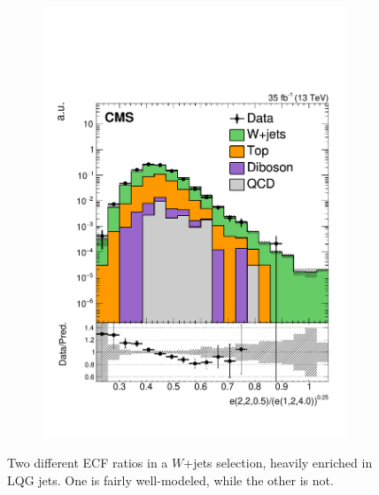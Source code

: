 \begin{figure}[]
\begin{center}
\begin{subfigure}[t]{0.32\textwidth}
            \includegraphics[width=\textwidth]{figures/toptagging/datamc/singlemuonw_ratio_22051240_logy.pdf}
        \end{subfigure}
        \caption{Two different ECF ratios in a $W$+jets selection, heavily enriched in LQG jets.
                 One is fairly well-modeled, while the other is not. }
        \label{fig:jets:datamc_ratios}
    \end{center}
\end{figure}

